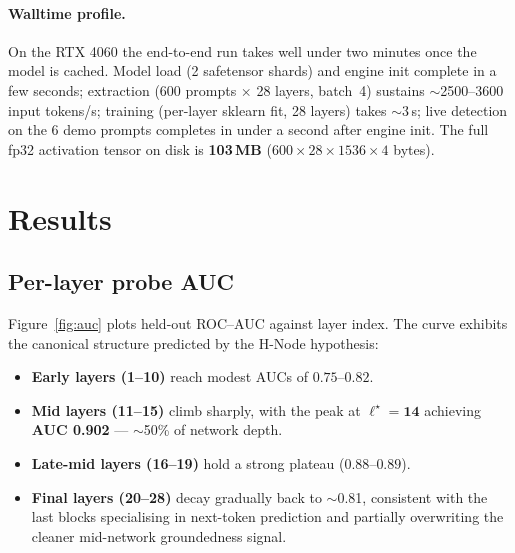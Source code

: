 \documentclass[11pt]{article}
\begin{document}
\paragraph{Walltime profile.} On the RTX 4060 the end-to-end run takes well under two minutes
once the model is cached. Model load (2 safetensor shards) and engine init complete in a few
seconds; extraction (600 prompts $\times$ 28 layers, batch~4) sustains $\sim$2500--3600 input
tokens/s; training (per-layer sklearn fit, 28 layers) takes $\sim$3\,s; live detection on the
6 demo prompts completes in under a second after engine init. The full fp32 activation tensor
on disk is \textbf{103\,MB} ($600 \times 28 \times 1536 \times 4$ bytes).

\section{Results}

\subsection{Per-layer probe AUC}
Figure~\ref{fig:auc} plots held-out ROC--AUC against layer index. The curve exhibits the
canonical structure predicted by the H-Node hypothesis:
\begin{itemize}
  \item \textbf{Early layers (1--10)} reach modest AUCs of $0.75$--$0.82$.
  \item \textbf{Mid layers (11--15)} climb sharply, with the peak at
  $\ell^\star{=}\mathbf{14}$ achieving \textbf{AUC 0.902} --- $\sim$50\% of network depth.
  \item \textbf{Late-mid layers (16--19)} hold a strong plateau ($0.88$--$0.89$).
  \item \textbf{Final layers (20--28)} decay gradually back to $\sim$0.81, consistent with the
  last blocks specialising in next-token prediction and partially overwriting the cleaner
  mid-network groundedness signal.
\end{itemize}
\end{document}
